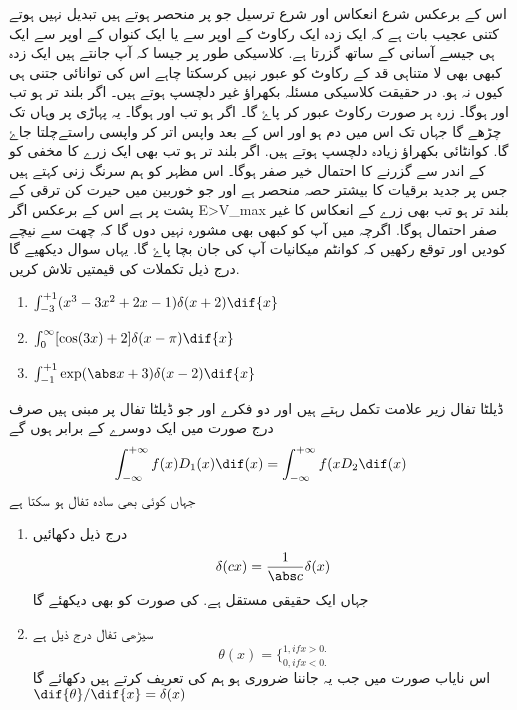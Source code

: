 اس کے برعکس شرع انعکاس اور شرع ترسیل جو  پر منحصر ہوتے ہیں تبدیل نہیں ہوتے کتنی عجیب بات ہے کہ ایک زدہ ایک رکاوٹ کے اوپر سے یا ایک کنواں  کے اوپر سے ایک ہی جیسے آسانی کے ساتھ گزرتا ہے.  کلاسیکی طور پر جیسا کہ آپ جانتے ہیں ایک زدہ کبھی بھی لا متناہی  قد کے رکاوٹ کو عبور نہیں کرسکتا چاہے اس کی توانائی جتنی ہی کیوں نہ ہو.   در حقیقت کلاسیکی مسئلہ بکھراؤ غیر دلچسپ ہوتے ہیں۔ اگر  بلند تر ہو تب  اور  ہوگا۔ زرہ ہر صورت رکاوٹ عبور کر پاۓ گا۔ اگر    ہو تب  اور  ہوگا۔ یہ پہاڑی پر وہاں تک چڑھے گا جہاں تک اس میں دم ہو اور اس کے بعد واپس اتر کر واپسی راستےچلتا جاۓ گا. کوانٹائی بکھراؤ زیادہ دلچسپ ہوتے ہیں.  اگر   بلند تر ہو تب بھی ایک زرے کا مخفی کو کے اندر سے گزرنے کا احتمال خیر صفر ہوگا۔ اس مظہر کو ہم سرنگ زنی کہتے ہیں جس پر جدید برقیات کا بیشتر حصہ منحصر ہے اور جو خوربین میں حیرت کن ترقی کے پشت پر ہے اس کے برعکس اگر {  E\textgreater V_{max}  }  بلند تر ہو تب بھی زرے کے انعکاس کا غیر صفر احتمال ہوگا. اگرچہ میں آپ کو کبھی بھی مشورہ نہیں دوں گا کہ چھت سے نیچے کودیں اور توقع رکھیں کہ کوانٹم میکانیات آپ کی جان بچا پاۓ گا. یہاں سوال  دیکھیے گا 
درج ذیل تکملات کی قیمتیں تلاش کریں.
\begin{enumerate}
\item\(\int_{-3}^{+1}(x^{3}-3x^{2}+2x-1) \delta(x+2) \dif{x}\)
\item\( \int_{0}^{\infty}[\cos(3x)+2] \delta(x-\pi) \dif{x}\)
\item\(\int_{-1}^{+1}\exp(\abs x+3) \delta (x-2) \dif{x}\)
\end{enumerate}
 ڈیلٹا تفال زیر علامت تکمل رہتے ہیں اور دو فکرے  اور جو ڈیلٹا تفال پر مبنی ہیں صرف درج صورت میں ایک دوسرے کے برابر ہوں گے  \[\int_{-\infty}^{+\infty}f(x) D_1(x) \dif(x)=\int_{-\infty}^{+\infty}f(x D_2 \dif(x)\] جہاں   کوئی بھی سادہ تفال ہو سکتا ہے  
\begin{enumerate}
\item درج ذیل دکھائیں
 \[\delta(cx)=\frac{1}{\abs c}\delta(x)\]
جہاں  ایک حقیقی مستقل ہے.   کی صورت کو بھی دیکھئے گا 
\item    سیڑھی تفال   درج ذیل ہے 
\[\theta(x)=\{^{1, if x>0.}_{0,if x<0.}\]
 اس نایاب صورت میں جب یہ جاننا ضروری ہو ہم  کی تعریف  کرتے ہیں دکھائے گا  \(\dif{\theta}/\dif{x}=\delta(x)\)
\end{enumerate}
